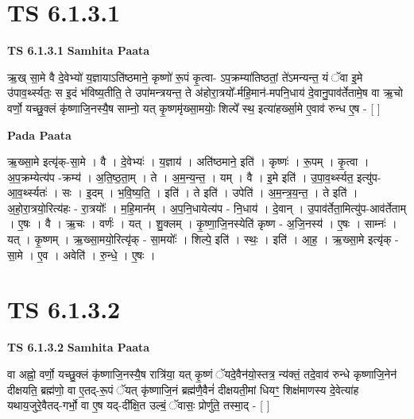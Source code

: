 \documentclass[17pt]{extarticle}
\begin{document}
\section*{ TS 6.1.3.1 }

\textbf{TS 6.1.3.1 } \newline
\textbf{Samhita Paata} \newline

ऋ॒ख् सा॒मे वै दे॒वेभ्यो॑ य॒ज्ञायाऽति॑ष्ठमाने॒ कृष्णो॑ रू॒पं कृ॒त्वा- ऽप॒क्रम्या॑तिष्ठतां॒ ते॑ऽमन्यन्त॒ यं ॅवा इ॒मे उ॑पाव॒र्थ्स्यतः॒ स इ॒दं भ॑विष्य॒तीति॒ ते उपा॑मन्त्रयन्त॒ ते अ॑होरा॒त्रयो᳚-र्महि॒मान॑-मपनि॒धाय॑ दे॒वानु॒पाव॑र्तेतामे॒ष वा ऋ॒चो वर्णो॒ यच्छु॒क्लं कृ॑ष्णाजि॒नस्यै॒ष साम्नो॒ यत् कृ॒ष्णमृ॑ख्सा॒मयोः॒ शिल्पे᳚ स्थ॒ इत्या॑हर्ख्सा॒मे ए॒वाव॑ रुन्ध ए॒ष - [  ] \newline

\textbf{Pada Paata} \newline

ऋ॒ख्सा॒मे इत्यृ॑क्-सा॒मे । वै । दे॒वेभ्यः॑ । य॒ज्ञाय॑ । अति॑ष्ठमाने॒ इति॑ । कृष्णः॑ । रू॒पम् । कृ॒त्वा । अ॒प॒क्रम्येत्य॑प -क्रम्य॑ । अ॒ति॒ष्ठ॒ता॒म् । ते । अ॒म॒न्य॒न्त॒ । यम् । वै । इ॒मे इति॑ । उ॒पा॒व॒र्थ्स्यत॒ इत्यु॑प-आ॒व॒र्थ्स्यतः॑ । सः । इ॒दम् । भ॒वि॒ष्य॒ति॒ । इति॑ । ते इति॑ । उपेति॑ । अ॒म॒न्त्र॒य॒न्त॒ । ते इति॑ । अ॒हो॒रा॒त्रयो॒रित्य॑हः - रा॒त्रयोः᳚ । म॒हि॒मान᳚म् । अ॒प॒नि॒धायेत्य॑प - नि॒धाय॑ । दे॒वान् । उ॒पाव॑र्तेता॒मित्यु॑प-आव॑र्तेताम् । ए॒षः । वै । ऋ॒चः । वर्णः॑ । यत् । शु॒क्लम् । कृ॒ष्णा॒जि॒नस्येति॑ कृष्ण - अ॒जि॒नस्य॑ । ए॒षः । साम्नः॑ । यत् । कृ॒ष्णम् । ऋ॒ख्सा॒मयो॒रित्यृ॑क् - सा॒मयोः᳚ । शिल्पे॒ इति॑ । स्थः॒ । इति॑ । आ॒ह॒ । ऋ॒ख्सा॒मे इत्यृ॑क् - सा॒मे । ए॒व । अवेति॑ । रु॒न्धे॒ । ए॒षः ।  \newline




\section*{ TS 6.1.3.2 }

\textbf{TS 6.1.3.2 } \newline
\textbf{Samhita Paata} \newline

वा अह्नो॒ वर्णो॒ यच्छु॒क्लं कृ॑ष्णाजि॒नस्यै॒ष रात्रि॑या॒ यत् कृ॒ष्णं ॅयदे॒वैन॑यो॒स्तत्र॒ न्य॑क्तं॒ तदे॒वाव॑ रुन्धे कृष्णाजि॒नेन॑ दीक्षयति॒ ब्रह्म॑णो॒ वा ए॒तद्-रू॒पं ॅयत् कृ॑ष्णाजि॒नं ब्रह्म॑णै॒वैनं॑ दीक्षयती॒मां धियꣳ॒॒ शिक्ष॑माणस्य दे॒वेत्या॑ह यथाय॒जुरे॒वैतद्-गर्भो॒ वा ए॒ष यद्-दी᳚क्षि॒त उल्बं॒ ॅवासः॒ प्रोर्णु॑ते॒ तस्मा॒द् - [  ] \newline
\end{document}
